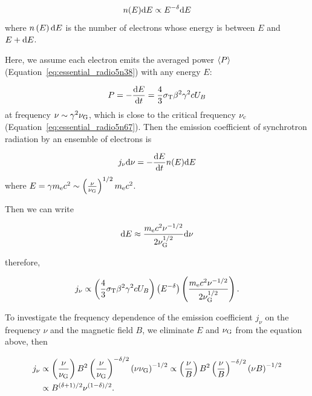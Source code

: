 \begin{equation}\label{eq:essential_radio5n70}
    n(E) \mathrm{d} E \propto E^{-\delta} \mathrm{d} E
\end{equation}
where $n\left(E\right)\mathrm{d} E$ is the number of electrons whose energy is between $E$ and $E+\mathrm{d} E$.

Here, we assume each electron emits the averaged power $\left\langle P\right\rangle$ (Equation~\ref{eq:essential_radio5n38}) with any energy $E$:

\begin{equation}\label{eq:essential_radio5n71}
    P=-\frac{\mathrm{d} E}{\mathrm{d} t}=\frac{4}{3} \sigma_{\mathrm{T}} \beta^2 \gamma^2 c U_B
\end{equation}
at frequency $\nu \sim \gamma^2\nu_{\mathrm{G}}$, which is close to the critical frequency $\nu_{\mathrm{c}}$ (Equation~\ref{eq:essential_radio5n67}).
Then the emission coefficient of synchrotron radiation by an ensemble of electrons is

\begin{equation}\label{eq:essential_radio5n73}
    j_{\nu} \mathrm{d} \nu=-\frac{\mathrm{d} E}{\mathrm{d} t} n(E) \mathrm{d} E
\end{equation}
where $E = \gamma m_{\mathrm{e}} c^2 \sim \left(\frac{\nu}{\nu_{\mathrm{G}}}\right)^{1/2} m_{\mathrm{e}}c^2$.

Then we can write

\begin{equation}\label{eq:essential_radio5n75}
    \mathrm{d} E \approx \frac{m_{\mathrm{e}} c^2 \nu^{-1 / 2}}{2 \nu_{\mathrm{G}}^{1 / 2}} \mathrm{d} \nu
\end{equation}

therefore,

\begin{equation}\label{eq:essential_radio5n76}
    j_{\nu} \propto\left(\frac{4}{3} \sigma_{\mathrm{T}} \beta^2 \gamma^2 c U_B\right)\left(E^{-\delta}\right)\left(\frac{m_{\mathrm{e}} c^2 \nu^{-1 / 2}}{2 \nu_{\mathrm{G}}^{1 / 2}}\right).
\end{equation}

To investigate the frequency dependence of the emission coefficient $j_{\nu}$ on the frequency $\nu$ and the magnetic field $B$, we eliminate  $E$ and $\nu_{\mathrm{G}}$ from the equation above, then

\begin{equation}\label{eq:essential_radio5n77}
    \begin{aligned}
        j_{\nu} & \propto \left(\frac{\nu}{\nu_{\mathrm{G}}}\right) B^2 \left(\frac{\nu}{\nu_{\mathrm{G}}}\right)^{-\delta / 2} \left(\nu \nu_{\mathrm{G}}\right)^{-1 / 2} \propto \left(\frac{\nu}{B}\right) B^2 \left(\frac{\nu}{B}\right)^{-\delta / 2} \left(\nu B\right)^{-1 / 2}\\
                & \propto B^{(\delta+1) / 2} \nu^{(1-\delta) / 2}.
    \end{aligned}
\end{equation}


